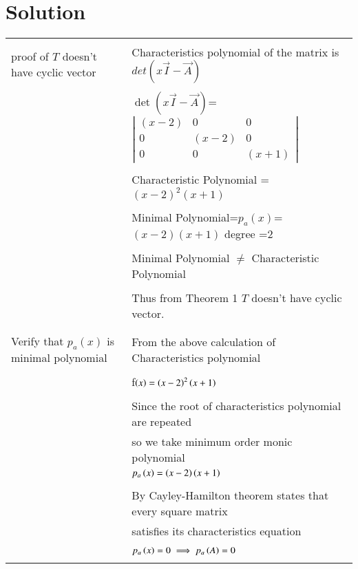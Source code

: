 \documentclass[journal,12pt]{IEEEtran}
\begin{document}
\section{\textbf{Solution}}
\renewcommand{\thetable}{2}
\begin{longtable}{|l|l|}
\hline

\multirow{3}{*}{proof of $T$ doesn't have cyclic vector } & \\
&
Characteristics polynomial of the matrix  is $det(x\vec{I}-\vec{A})$\\ 
&\\
& $\det(x\vec{I}-\vec{A})$= $\left|
                \begin{array}{ccc}
                (x-2) & 0 & 0\\
                0 & (x-2) & 0\\
                0 & 0 & (x+1)
                \end{array} \right|$  \\
&\\
& Characteristic Polynomial = $(x-2)^2(x+1)$\\
&\\
& Minimal Polynomial=$p_a(x)$=$(x-2)(x+1)$  degree =2   \\
&\\
&Minimal Polynomial $\neq$ Characteristic Polynomial \\
&\\
&Thus from Theorem 1 $T$ doesn't have cyclic vector.\\  
&\\
\hline
\multirow{3}{*}{Verify that $p_a(x)$ is minimal polynomial} & \\
&From the above calculation of Characteristics polynomial\\
&\\
&f$\left(x\right)=\left(x-2\right)^2\left(x+1\right)$\\
&\\
&Since the root of characteristics polynomial are repeated\\
&so we take minimum order monic polynomial\\
&$p_a\left(x\right)=\left(x-2\right)\left(x+1\right)$\\
&\\

& By Cayley-Hamilton theorem states that every square matrix  \\
&satisfies its characteristics equation\\
&\\
&$p_a\left(x\right)=0 \implies p_a\left(A\right)=0$\\
&\\


\end{longtable}
\end{document}
